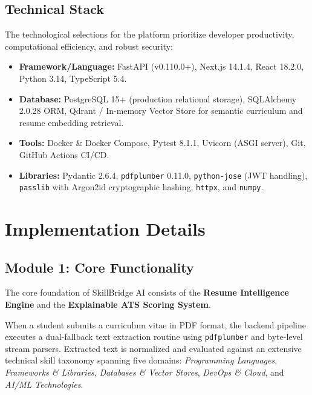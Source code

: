 \documentclass[12pt,a4paper,oneside]{report}
\begin{document}
\subsection{Technical Stack}
The technological selections for the platform prioritize developer productivity, computational efficiency, and robust security:
\begin{itemize}[leftmargin=0.8cm]
    \item \textbf{Framework/Language:} FastAPI (v0.110.0+), Next.js 14.1.4, React 18.2.0, Python 3.14, TypeScript 5.4.
    \item \textbf{Database:} PostgreSQL 15+ (production relational storage), SQLAlchemy 2.0.28 ORM, Qdrant / In-memory Vector Store for semantic curriculum and resume embedding retrieval.
    \item \textbf{Tools:} Docker \& Docker Compose, Pytest 8.1.1, Uvicorn (ASGI server), Git, GitHub Actions CI/CD.
    \item \textbf{Libraries:} Pydantic 2.6.4, \texttt{pdfplumber} 0.11.0, \texttt{python-jose} (JWT handling), \texttt{passlib} with Argon2id cryptographic hashing, \texttt{httpx}, and \texttt{numpy}.
\end{itemize}

\section{Implementation Details}

\subsection{Module 1: Core Functionality}
The core foundation of SkillBridge AI consists of the \textbf{Resume Intelligence Engine} and the \textbf{Explainable ATS Scoring System}. 

When a student submits a curriculum vitae in PDF format, the backend pipeline executes a dual-fallback text extraction routine using \texttt{pdfplumber} and byte-level stream parsers. Extracted text is normalized and evaluated against an extensive technical skill taxonomy spanning five domains: \textit{Programming Languages}, \textit{Frameworks \& Libraries}, \textit{Databases \& Vector Stores}, \textit{DevOps \& Cloud}, and \textit{AI/ML Technologies}.
\end{document}
